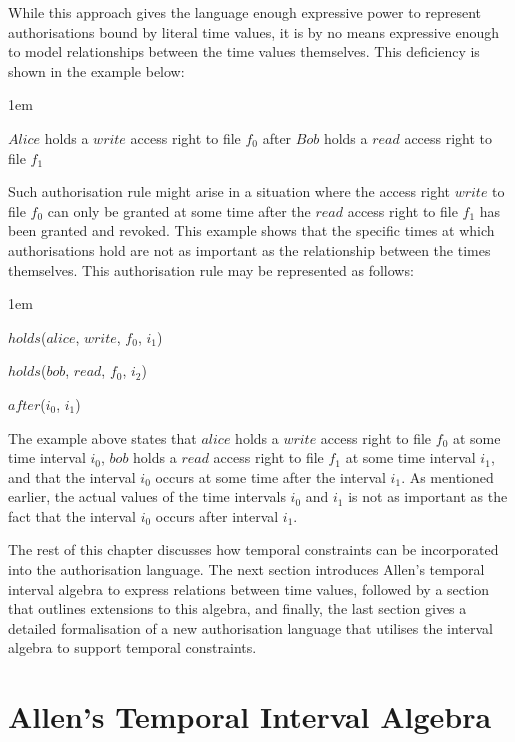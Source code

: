\documentclass[11pt]{report}
\newenvironment{vquote}
{
  \begin{list}{}{\leftmargin 1em}\item[]
}
{
  \end{list}
}
\begin{document}
      While this approach gives the language enough expressive power to
      represent authorisations bound by literal time values, it is by no means
      expressive enough to model relationships between the time values
      themselves. This deficiency is shown in the example below:

      \begin{vquote}
        $Alice$ holds a $write$ access right to file $f_0$ after $Bob$ holds a
        $read$ access right to file $f_1$
      \end{vquote}

      Such authorisation rule might arise in a situation where the access right
      $write$ to file $f_0$ can only be granted at some time after the $read$
      access right to file $f_1$ has been granted and revoked. This example
      shows that the specific times at which authorisations hold are not as
      important as the relationship between the times themselves. This
      authorisation rule may be represented as follows:

      \begin{vquote}
        $holds$($alice$, $write$, $f_0$, $i_{1}$)

        $holds$($bob$, $read$, $f_0$, $i_{2}$)

        $after$($i_0$, $i_1$)
      \end{vquote}

      The example above states that $alice$ holds a $write$ access right to
      file $f_0$ at some time interval $i_0$, $bob$ holds a $read$ access right
      to file $f_1$ at some time interval $i_1$, and that the interval $i_0$
      occurs at some time after the interval $i_1$. As mentioned earlier, the
      actual values of the time intervals $i_0$ and $i_1$ is not as important
      as the fact that the interval $i_0$ occurs after interval $i_1$.

      The rest of this chapter discusses how temporal constraints can be
      incorporated into the authorisation language. The next section introduces
      Allen's temporal interval algebra to express relations between time
      values, followed by a section that outlines extensions to this algebra,
      and finally, the last section gives a detailed formalisation of a new
      authorisation language that utilises the interval algebra to support
      temporal constraints.

    \section{Allen's Temporal Interval Algebra}
      \label{sect-tempo-algeb}
\end{document}
